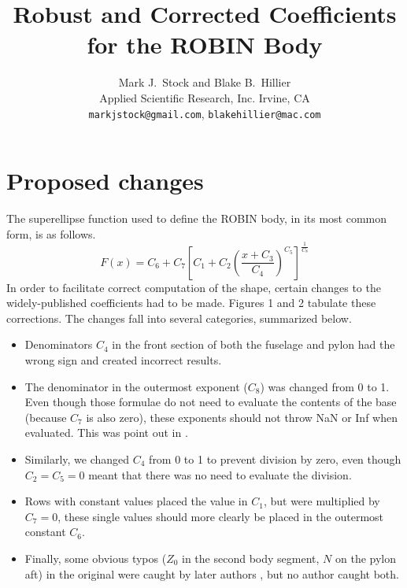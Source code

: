 \documentclass[12pt]{article}
\title{Robust and Corrected Coefficients for the ROBIN Body}
\author{Mark J.~Stock and Blake B.~Hillier\\
        Applied Scientific Research, Inc.
        Irvine, CA\\
        \texttt{markjstock@gmail.com}, \texttt{blakehillier@mac.com}
}
\begin{document}
\maketitle



\section{Proposed changes}
The superellipse function used to define the ROBIN body, in its most common form, is as follows.
\begin{equation}
  F(x) = C_{6}+C_{7}\left[C_{1}+C_{2}\left(\frac{x+C_{3}}{C_{4}}\right)^{C_{5}}\right]^{\frac{1}{C_{8}}}
\end{equation}
In order to facilitate correct computation of the shape, certain changes to the
widely-published coefficients had to be made.
Figures 1 and 2 tabulate these corrections.
The changes fall into several categories, summarized below.
\begin{itemize}
\item Denominators $C_{4}$ in the front section of both the fuselage and pylon had the wrong sign
and created incorrect results.
\item The denominator in the outermost exponent ($C_{8}$) was changed from 0 to 1. Even though
those formulae do not need to evaluate the contents of the base (because $C_{7}$ is also zero),
these exponents should not throw NaN or Inf when evaluated. This was point out in \cite{nasa87762}.
\item Similarly, we changed $C_{4}$ from 0 to 1 to prevent division by zero, even though
$C_{2}=C_{5}=0$ meant that there was no need to evaluate the division.
\item Rows with constant values placed the value in $C_{1}$, but were multiplied by $C_{7}=0$,
these single values should more clearly be placed in the outermost constant $C_{6}$.
\item Finally, some obvious typos ($Z_0$ in the second body segment, $N$ on the pylon aft)
in the original \cite{nasa80051} were
caught by later authors \cite{nasa87762,mineckgorton}, but no author caught both.
\end{itemize}
\end{document}
